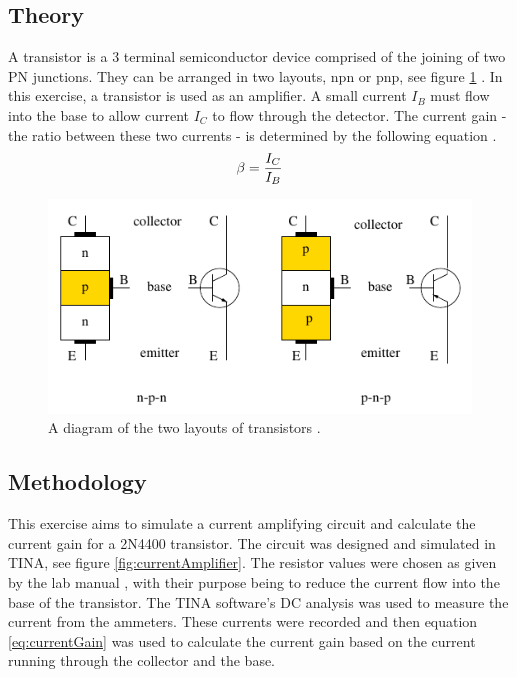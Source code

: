 \documentclass[%
reprint,
amsmath,amssymb,
aps,
floatfix
]{revtex4-2}
\begin{document}
		\subsection{Theory}
		A transistor is a 3 terminal semiconductor device comprised of the joining of two PN junctions. They can be arranged in two layouts, npn or pnp, see figure \ref{fig:transistors} \cite{horowitz}. In this exercise, a transistor is used as an amplifier. A small current $I_B$ must flow into the base to allow current $I_C$ to flow through the detector. The current gain - the ratio between these two currents - is determined by the following equation \cite{horowitz}.
		\begin{equation}
			\beta = {I_C \over I_B}
			\label{eq:currentGain}
		\end{equation}
		
		\begin{figure}
			\includegraphics[width=0.85\columnwidth]{transistors.png}
			\caption{\label{fig:transistors}A diagram of the two layouts of transistors \cite{manual}.}
		\end{figure}
		
		\subsection{Methodology}
		
		This exercise aims to simulate a current amplifying circuit and calculate the current gain for a 2N4400 transistor. The circuit was designed and simulated in TINA, see figure \ref{fig:currentAmplifier}. The resistor values were chosen as given by the lab manual \cite{manual}, with their purpose being to reduce the current flow into the base of the transistor. The TINA software's DC analysis was used to measure the current from the ammeters. These currents were recorded and then equation \ref{eq:currentGain} was used to calculate the current gain based on the current running through the collector and the base.
		
\end{document}
